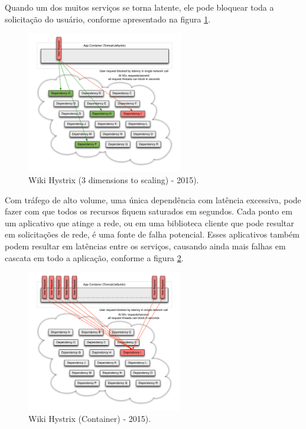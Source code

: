 \documentclass[journal]{IEEEtran}
\begin{document}
Quando um dos muitos serviços se torna latente, ele pode bloquear toda a solicitação do usuário, conforme apresentado na figura \ref{fig:hystrix-dimensions-scaling}.

\begin{figure}[h]
\centering
\includegraphics[height=6.2cm]{figura4}
\caption{Wiki Hystrix (3 dimensions to scaling) - 2015).}
\label{fig:hystrix-dimensions-scaling}
\end{figure}

Com tráfego de alto volume, uma única dependência com latência excessiva, pode fazer com que todos os recursos fiquem saturados em segundos. Cada ponto em um aplicativo que atinge a rede, ou em uma biblioteca cliente que pode resultar em solicitações de rede, é uma fonte de falha potencial. Esses aplicativos também podem resultar em latências entre os serviços, causando ainda mais falhas em cascata em todo a aplicação, conforme a figura \ref{fig:hystrix-container}.

\begin{figure}[h]
\centering
\includegraphics[height=6.2cm]{figura5}
\caption{Wiki Hystrix (Container) - 2015).}
\label{fig:hystrix-container}
\end{figure}
\end{document}
